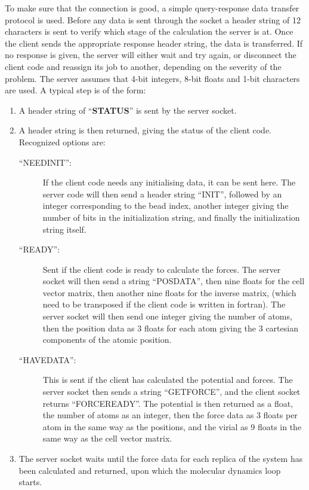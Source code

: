 \documentclass[11pt,english,fleqn]{report}
\begin{document}
To make sure that the connection is good, a simple query-response
data transfer protocol is used. Before any data is sent through the
socket a header string of 12 characters is sent to verify which stage
of the calculation the server is at. Once the client sends the appropriate
response header string, the data is transferred. If no response is
given, the server will either wait and try again, or disconnect the
client code and reassign its job to another, depending on the severity
of the problem. The server assumes that 4-bit integers, 8-bit floats
and 1-bit characters are used. A typical step is of the form:
\begin{enumerate}
\item A header string of {}``\textbf{STATUS}'' is sent by the server socket.
\item A header string is then returned, giving the status of the client
code. Recognized options are:

\begin{description}
\item [{{}``NEEDINIT'':}] If the client code needs any initialising data,
it can be sent here. The server code will then send a header string
{}``INIT'', followed by an integer corresponding to the bead index,
another integer giving the number of bits in
the initialization string, and finally the initialization string itself.
\item [{{}``READY'':}] Sent if the client code is ready to calculate
the forces. The server socket will then send a string {}``POSDATA'',
then nine floats for the cell vector matrix, then another nine floats
for the inverse matrix, (which need to be transposed if the client
code is written in fortran). The server socket will then send one
integer giving the number of atoms, then the position data as 3 floats
for each atom giving the 3 cartesian components of the atomic position.
\item [{{}``HAVEDATA'':}] This is sent if the client has calculated the
potential and forces. The server socket then sends a string {}``GETFORCE'',
and the client socket returns {}``FORCEREADY''. The potential is
then returned as a float, the number of atoms as an integer, then
the force data as 3 floats per atom in the same way as the positions,
and the virial as 9 floats in the same way as the cell vector matrix.
\end{description}
\item The server socket waits until the force data for each replica of the
system has been calculated and returned, upon which the 
molecular dynamics loop starts.
\end{enumerate}
\end{document}
